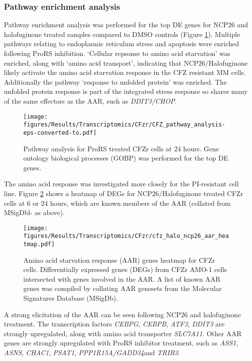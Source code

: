 \subsubsection{Pathway enrichment analysis}
Pathway enrichment analysis was performed for the top DE genes for NCP26 and halofuginone treated samples compared to DMSO controls (Figure \ref{fig:cfz_pathway}).
Multiple pathways relating to endoplasmic reticulum stress and apoptosis were enriched following ProRS inhibition.
`Cellular repsonse to amino acid starvation' was enriched, along with `amino acid transport', indicating that NCP26/Halofuginone likely activate the amino acid starvation response in the CFZ resistant MM cells.
Additionally the pathway `response to unfolded protein' was enriched.
The unfolded protein response is part of the integrated stress response so shares many of the same effectors as the AAR, such as \textit{DDIT3/CHOP}.

\begin{figure}[htb]
\centering
\texttt{[image: figures/Results/Transcriptomics/CFzr/CFZ\_pathway\_analysis-eps-converted-to.pdf]}
\caption[Pathway analysis for ProRS inhibitor-treated CFZr cells]{Pathway analysis for ProRS treated CFZr cells at 24 hours.
Gene ontology biological processes (GOBP) was performed for the top DE genes.
}
\label{fig:cfz_pathway}
\end{figure}
%
The amino acid response was investigated more closely for the PI-resistant cell line.
Figure \ref{fig:cfz_aar_heatmap} shows a heatmap of DEGs for NCP26/Halofuginone treated CFZr cells at 6 or 24 hours, which are known members of the AAR (collated from MSigDbl- as above).

\begin{figure}[p]
\centering
\texttt{[image: figures/Results/Transcriptomics/CFzr/cfz\_halo\_ncp26\_aar\_heatmap.pdf]}
\caption[Amino acid starvation response genes heatmap CFZr cells]{Amino acid starvation response (AAR) genes heatmap for CFZr cells.
Differentially expressed genes (DEGs) from CFZr AMO-1 cells intersected with genes involved in the AAR.
A list of known AAR genes was compiled by collating AAR genesets from the Molecular Signatures Database (MSigDb).
}
\label{fig:cfz_aar_heatmap}
\end{figure}
A strong elicitation of the AAR can be seen following NCP26 and halofuginone treatment.
The transcription factors \textit{CEBPG}, \textit{CEBPB}, \textit{ATF3}, \textit{DDIT3} are strongly upregulated, along with amino acid transporter \textit{SLC7A11}.
Other AAR genes are strongly upregulated with ProRS inhibitor treatment, such as \textit{ASS1}, \textit{ASNS}, \textit{CHAC1}, \textit{PSAT1}, \textit{PPP1R15A/GADD34}and \textit{TRIB3}.

